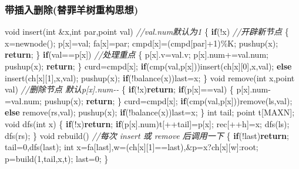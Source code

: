 \documentclass[
]{article}
\newenvironment{Shaded}{}{}
\newcommand{\CommentTok}[1]{\textcolor[rgb]{0.38,0.63,0.69}{\textit{#1}}}
\newcommand{\ControlFlowTok}[1]{\textcolor[rgb]{0.00,0.44,0.13}{\textbf{#1}}}
\newcommand{\DataTypeTok}[1]{\textcolor[rgb]{0.56,0.13,0.00}{#1}}
\newcommand{\DecValTok}[1]{\textcolor[rgb]{0.25,0.63,0.44}{#1}}
\newcommand{\NormalTok}[1]{#1}
\begin{document}
\hypertarget{ux5e26ux63d2ux5165ux5220ux9664ux66ffux7f6aux7f8aux6811ux91cdux6784ux601dux60f3}{%
\subsubsection{带插入删除(替罪羊树重构思想)}\label{ux5e26ux63d2ux5165ux5220ux9664ux66ffux7f6aux7f8aux6811ux91cdux6784ux601dux60f3}}

\begin{Shaded}
\begin{Highlighting}[]
\DataTypeTok{void}\NormalTok{ insert(}\DataTypeTok{int}\NormalTok{ \&x,}\DataTypeTok{int}\NormalTok{ par,point val) }\CommentTok{//val.num默认为1}
\NormalTok{\{}
    \ControlFlowTok{if}\NormalTok{(!x) }\CommentTok{//开辟新节点}
\NormalTok{    \{}
\NormalTok{        x=newnode();}
\NormalTok{        p[x]=val;}
\NormalTok{        fa[x]=par;}
\NormalTok{        cmpd[x]=(cmpd[par]+}\DecValTok{1}\NormalTok{)\%K;}
\NormalTok{        pushup(x);}
        \ControlFlowTok{return}\NormalTok{;}
\NormalTok{    \}}
    \ControlFlowTok{if}\NormalTok{(val==p[x]) }\CommentTok{//处理重点}
\NormalTok{    \{}
\NormalTok{        p[x].v=val.v;}
\NormalTok{        p[x].num+=val.num;}
\NormalTok{        pushup(x);}
        \ControlFlowTok{return}\NormalTok{;}
\NormalTok{    \}}
\NormalTok{    curd=cmpd[x];}
    \ControlFlowTok{if}\NormalTok{(cmp(val,p[x]))insert(ch[x][}\DecValTok{0}\NormalTok{],x,val);}
    \ControlFlowTok{else}\NormalTok{ insert(ch[x][}\DecValTok{1}\NormalTok{],x,val);}
\NormalTok{    pushup(x);}
    \ControlFlowTok{if}\NormalTok{(!balance(x))last=x;}
\NormalTok{\}}
\DataTypeTok{void}\NormalTok{ remove(}\DataTypeTok{int}\NormalTok{ x,point val) }\CommentTok{//删除节点 默认p[x].num{-}{-}}
\NormalTok{\{}
    \ControlFlowTok{if}\NormalTok{(!x)}\ControlFlowTok{return}\NormalTok{;}
    \ControlFlowTok{if}\NormalTok{(p[x]==val)}
\NormalTok{    \{}
\NormalTok{        p[x].num{-}=val.num;}
\NormalTok{        pushup(x);}
        \ControlFlowTok{return}\NormalTok{;}
\NormalTok{    \}}
\NormalTok{    curd=cmpd[x];}
    \ControlFlowTok{if}\NormalTok{(cmp(val,p[x]))remove(ls,val);}
    \ControlFlowTok{else}\NormalTok{ remove(rs,val);}
\NormalTok{    pushup(x);}
    \ControlFlowTok{if}\NormalTok{(!balance(x))last=x;}
\NormalTok{\}}
\DataTypeTok{int}\NormalTok{ tail; point t[MAXN]; }
\DataTypeTok{void}\NormalTok{ dfs(}\DataTypeTok{int}\NormalTok{ x)}
\NormalTok{\{}
    \ControlFlowTok{if}\NormalTok{(!x)}\ControlFlowTok{return}\NormalTok{;}
    \ControlFlowTok{if}\NormalTok{(p[x].num)t[++tail]=p[x];}
\NormalTok{    rec[++h]=x;}
\NormalTok{    dfs(ls);}
\NormalTok{    dfs(rs);}
\NormalTok{\}}
\DataTypeTok{void}\NormalTok{ rebuild() }\CommentTok{//每次 insert 或 remove 后调用一下}
\NormalTok{\{}
    \ControlFlowTok{if}\NormalTok{(!last)}\ControlFlowTok{return}\NormalTok{;}
\NormalTok{    tail=}\DecValTok{0}\NormalTok{,dfs(last);}
    \DataTypeTok{int}\NormalTok{ x=fa[last],w=(ch[x][}\DecValTok{1}\NormalTok{]==last),\&p=x?ch[x][w]:root;}
\NormalTok{    p=build(}\DecValTok{1}\NormalTok{,tail,x,t);}
\NormalTok{    last=}\DecValTok{0}\NormalTok{;}
\NormalTok{\}}
\end{Highlighting}
\end{Shaded}
\end{document}
